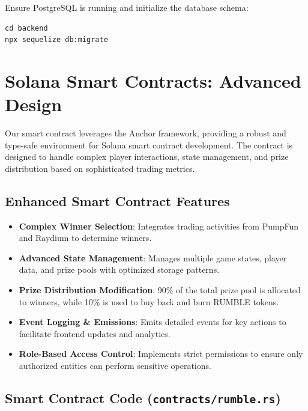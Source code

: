 \documentclass[11pt,a4paper]{article}
\begin{document}
Ensure PostgreSQL is running and initialize the database schema:

\begin{verbatim}
cd backend
npx sequelize db:migrate
\end{verbatim}

\section{Solana Smart Contracts: Advanced Design}

Our smart contract leverages the Anchor framework, providing a robust and type-safe environment for Solana smart contract development. The contract is designed to handle complex player interactions, state management, and prize distribution based on sophisticated trading metrics.

\subsection{Enhanced Smart Contract Features}

\begin{itemize}
    \item \textbf{Complex Winner Selection}: Integrates trading activities from PumpFun and Raydium to determine winners.
    \item \textbf{Advanced State Management}: Manages multiple game states, player data, and prize pools with optimized storage patterns.
    \item \textbf{Prize Distribution Modification}: 90\% of the total prize pool is allocated to winners, while 10\% is used to buy back and burn RUMBLE tokens.
    \item \textbf{Event Logging \& Emissions}: Emits detailed events for key actions to facilitate frontend updates and analytics.
    \item \textbf{Role-Based Access Control}: Implements strict permissions to ensure only authorized entities can perform sensitive operations.
\end{itemize}

\subsection{Smart Contract Code (\texttt{contracts/rumble.rs})}
\end{document}
